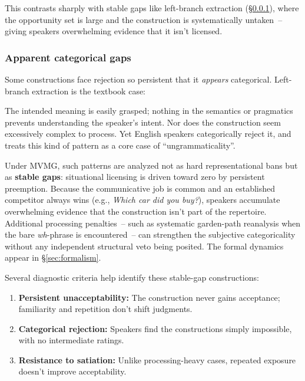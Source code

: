 \documentclass[12pt,letterpaper]{article}
\newcommand{\mention}[1]{\textit{#1}}
\begin{document}
This contrasts sharply with stable gaps like left-branch extraction (\S\ref{sec:categorical-constraints}), where the opportunity set is large and the construction is systematically untaken~-- giving speakers overwhelming evidence that it isn't licensed.

\subsubsection{Apparent categorical gaps}\label{sec:categorical-constraints}

Some constructions face rejection so persistent that it \emph{appears} categorical. Left-branch extraction is the textbook case:

\label{ex:LBC-cat}
\z

The intended meaning is easily grasped; nothing in the semantics or pragmatics prevents understanding the speaker's intent. Nor does the construction seem excessively complex to process. Yet English speakers categorically reject it, and \textcite[22]{Snyder2022} treats this kind of pattern as a core case of \enquote{ungrammaticality}.

Under MVMG, such patterns are analyzed not as hard representational bans but as \textbf{stable gaps}: situational licensing is driven toward zero by persistent preemption. Because the communicative job is common and an established competitor always wins (e.g., \mention{Which car did you buy?}), speakers accumulate overwhelming evidence that the construction isn't part of the repertoire. Additional processing penalties~-- such as systematic garden-path reanalysis when the bare \textit{wh}-phrase is encountered~-- can strengthen the subjective categoricality without any independent structural veto being posited. The formal dynamics appear in \S\ref{sec:formalism}.

Several diagnostic criteria help identify these stable-gap constructions:
\begin{enumerate}
\item \textbf{Persistent unacceptability:} The construction never gains acceptance; familiarity and repetition don't shift judgments.
\item \textbf{Categorical rejection:} Speakers find the constructions simply impossible, with no intermediate ratings.
\item \textbf{Resistance to satiation:} Unlike processing-heavy cases, repeated exposure doesn't improve acceptability.
\end{enumerate}
\end{document}
